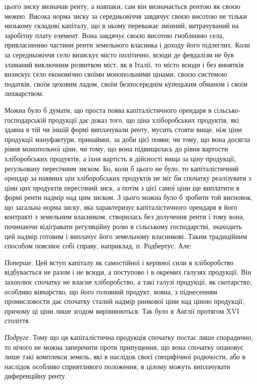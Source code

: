 \parcont{}  %
цього зиску визначав ренту, а навпаки, сам він визначається рентою як своєю
межею. Висока норма зиску за середньовіччя завдячує своєю висотою не тільки
низькому складові капіталу, що в ньому переважає змінний, витрачуваний на
заробітну плату елемент. Вона завдячує своєю висотою гнобленню села, привласненню
частини ренти земельного власника і доходу його підлеглих. Коли за
середньовіччя село визискує місто політично, всюди де февдалізм не був зламаний
виключним розвитком міст, як в Італії, то місто всюди і без винятків
визискує село економічно своїми монопольними цінами, своєю системою податків,
своїм цеховим ладом, своїм безпосереднім купецьким обманом і своїм
лихварством.

Можна було б думати, що проста поява капіталістичного орендаря в сільсько-господарській
продукції дає доказ того, що ціна хліборобських продуктів,
які здавна в тій чи іншій формі виплачували ренту, мусить стояти вище, ніж
ціни продукції мануфактури, принаймні, за доби цієї появи; чи тому, що
вона досягла рівня монопольної ціни, чи тому, що вона підвищилась до
рівня вартости хліборобських продуктів, а їхня вартість в дійсності вища за
ціну продукції, реґульовану пересічним зиском. Бо, коли б цього не було, то
капіталістичний орендар за наявних цін хліборобських продуктів не міг би
спочатку реалізувати з ціни цих продуктів пересічний зиск, а потім з цієї
самої ціни ще виплатити в формі ренти надмір над цим зиском. З цього можна
було б зробити той висновок, що загальна норма зиску, яка характеризує капіталістичного
орендаря в його контракті з земельним власником, створилась без
долучення ренти і тому вона, починаючи відігравати реґуляційну ролю в сільському
господарстві, знаходить цей надмір готовим і виплачує його земельному
власникові. Таким традиційним способом пояснює собі справу, наприклад,
п. Родбертус. Але:

\emph{Поперше}. Цей вступ капіталу як самостійної і керівної сили в хліборобство
відбувається не разом і не всюди, а поступово і в окремих галузях продукції.
Він захоплює спочатку не власне хліборобство, а такі галузі продукції,
як скотарство, особливо вівчарство, що його головний продукт, вовна, з піднесенням
промисловости дає спочатку сталий надмір ринкової ціни над ціною
продукції, причому ці ціни лише згодом вирівнюються. Так було в Англії протягом
XVI століття.

\emph{Подруге}. Тому що ця капіталістична продукція спочатку постає лише
спорадично, то нічого не можна заперечити проти припущення, що вона спочатку
опановує лише такі комплекси земель, які в наслідок своєї специфічної
родючости, або в наслідок особливо сприятливого положення, в цілому можуть
виплачувати диференційну ренту.

